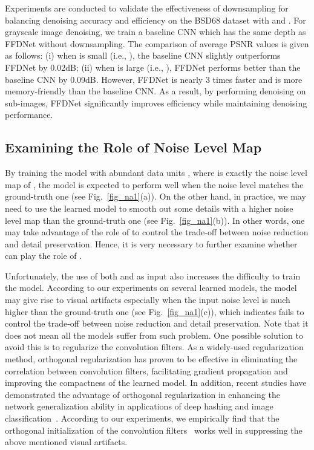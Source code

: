 \documentclass[journal]{IEEEtran}
\begin{document}
Experiments are conducted to validate the effectiveness of downsampling for balancing denoising accuracy and efficiency on the BSD68 dataset with  and . For grayscale image denoising, we train a baseline CNN which has the same depth as FFDNet without downsampling. The comparison of average PSNR values is given as follows: (i) when  is small (i.e., ), the baseline CNN slightly outperforms FFDNet by 0.02dB; (ii) when  is large (i.e., ), FFDNet performs better than the baseline CNN by 0.09dB. However, FFDNet is nearly 3 times faster and is more memory-friendly than the baseline CNN. As a result, by performing denoising on sub-images, FFDNet significantly improves efficiency while maintaining denoising performance.

\subsection{{Examining the Role of Noise Level Map}}

By training the model with abundant data units , where  is exactly the noise level map of , the model is expected to perform well when the noise level matches the ground-truth one (see Fig.~\ref{fig_na1}(a)).
On the other hand, in practice, we may need to use the learned model to smooth out some details with a higher noise level map than the ground-truth one (see Fig.~\ref{fig_na1}(b)).
In other words, one may take advantage of the role of  to control the trade-off between noise reduction and detail preservation.
Hence, it is very necessary to further examine whether  can play the role of .

Unfortunately, the use of both  and  as input also increases the difficulty to train the model.
According to our experiments on several learned models, the model may give rise to visual artifacts especially when the input noise level is much higher than the ground-truth one (see Fig.~\ref{fig_na1}(c)), which indicates  fails to control the trade-off between noise reduction and detail preservation.
Note that it does not mean all the models suffer from such problem.
One possible solution to avoid this is to regularize the convolution filters. As a widely-used regularization method, orthogonal regularization has proven to be effective in eliminating the correlation between convolution filters, facilitating gradient propagation and improving the compactness of the learned model.
In addition, recent studies have demonstrated the advantage of orthogonal regularization in enhancing the network generalization ability in applications of deep hashing and image classification~\cite{wang2015deep,mhammedi2016efficient,jia2016improving,xie2017all,sun2017svdnet}.
According to our experiments, we empirically find that the orthogonal initialization of the convolution filters~\cite{jia2016improving,2015arXiv151106422M} works well in suppressing the above mentioned visual artifacts.
\end{document}
